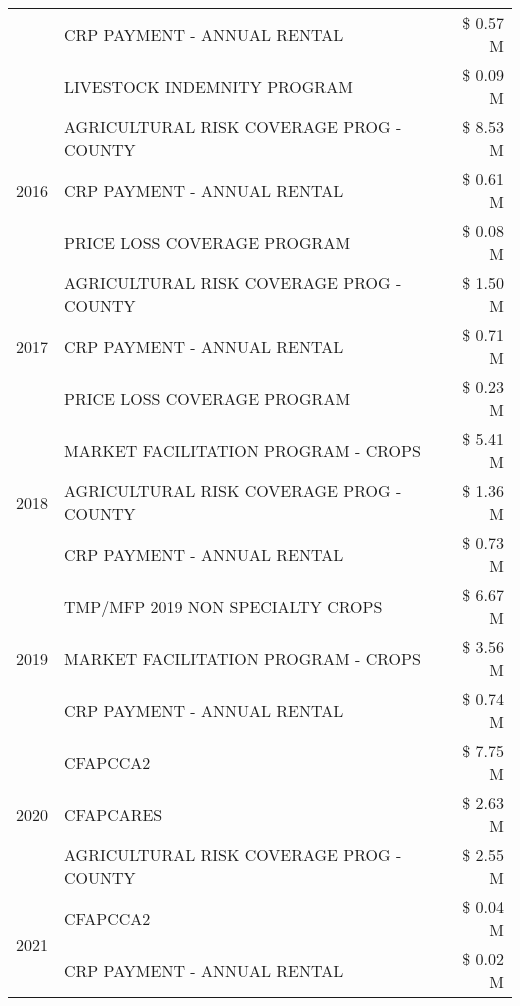 \begin{tabular}{llr}
 & CRP PAYMENT - ANNUAL RENTAL & \$ 0.57 M \\
 & LIVESTOCK INDEMNITY PROGRAM & \$ 0.09 M \\
\cline{1-3}
\multirow[t]{3}{*}{2016} & AGRICULTURAL RISK COVERAGE PROG - COUNTY      & \$ 8.53 M \\
 & CRP PAYMENT - ANNUAL RENTAL                   & \$ 0.61 M \\
 & PRICE LOSS COVERAGE PROGRAM                   & \$ 0.08 M \\
\cline{1-3}
\multirow[t]{3}{*}{2017} & AGRICULTURAL RISK COVERAGE PROG - COUNTY & \$ 1.50 M \\
 & CRP PAYMENT - ANNUAL RENTAL & \$ 0.71 M \\
 & PRICE LOSS COVERAGE PROGRAM & \$ 0.23 M \\
\cline{1-3}
\multirow[t]{3}{*}{2018} & MARKET FACILITATION PROGRAM - CROPS & \$ 5.41 M \\
 & AGRICULTURAL RISK COVERAGE PROG - COUNTY & \$ 1.36 M \\
 & CRP PAYMENT - ANNUAL RENTAL & \$ 0.73 M \\
\cline{1-3}
\multirow[t]{3}{*}{2019} & TMP/MFP 2019 NON SPECIALTY CROPS & \$ 6.67 M \\
 & MARKET FACILITATION PROGRAM - CROPS & \$ 3.56 M \\
 & CRP PAYMENT - ANNUAL RENTAL & \$ 0.74 M \\
\cline{1-3}
\multirow[t]{3}{*}{2020} & CFAPCCA2 & \$ 7.75 M \\
 & CFAPCARES & \$ 2.63 M \\
 & AGRICULTURAL RISK COVERAGE PROG - COUNTY & \$ 2.55 M \\
\cline{1-3}
\multirow[t]{2}{*}{2021} & CFAPCCA2 & \$ 0.04 M \\
 & CRP PAYMENT - ANNUAL RENTAL & \$ 0.02 M \\
\cline{1-3}
\bottomrule
\end{tabular}
